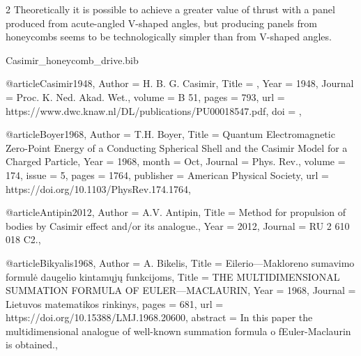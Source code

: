 \documentclass[twoside, 10pt]{article}
\def\myfilename{Casimir_honeycomb_drive}
\begin{document}
\begin{multicols}{2}
Theoretically it is possible to achieve a greater value of thrust with a
panel produced from acute-angled \mbox{V-shaped} angles, but producing
panels from honeycombs seems to be technologically simpler than
from \mbox{V-shaped} angles.


\begin{filecontents}{\myfilename.bib}


@article{Casimir1948,
    Author = {H. B. G. Casimir},
    Title = {},
    Year = {1948},
    Journal = {Proc. K. Ned. Akad. Wet.},
    volume = {B 51},
    pages = {793},
    url = {https://www.dwc.knaw.nl/DL/publications/PU00018547.pdf},
    doi = {},
}


@article{Boyer1968,
    Author = {T.H. Boyer},
    Title = {Quantum Electromagnetic Zero-Point Energy of a Conducting Spherical Shell and the Casimir Model for a Charged Particle},
    Year = {1968},
    month = {Oct},
    Journal = {Phys. Rev.},
    volume = {174},
    issue = {5},
    pages = {1764},
    publisher = {American Physical Society},
    url = {https://doi.org/10.1103/PhysRev.174.1764},
}


@article{Antipin2012,
    Author = {A.V. Antipin},
    Title = {Method for propulsion of bodies by Casimir effect and/or its analogue.},
    Year = {2012},
    Journal = {RU 2 610 018 C2.},
}


@article{Bikyalis1968,
    Author = {A. Bikelis},
    Title = {Eilerio—Makloreno sumavimo formulė daugelio kintamųjų funkcijoms},
    Title = {THE MULTIDIMENSIONAL SUMMATION FORMULA OF EULER—MACLAURIN},
    Year = {1968},
    Journal = {Lietuvos matematikos rinkinys},
    pages = {681},
    url = {https://doi.org/10.15388/LMJ.1968.20600},
    abstract = {In this paper the multidimensional analogue of well-known summation formula o fEuler-Maclaurin is obtained.},
}


\end{filecontents}
\end{multicols}
\end{document}
